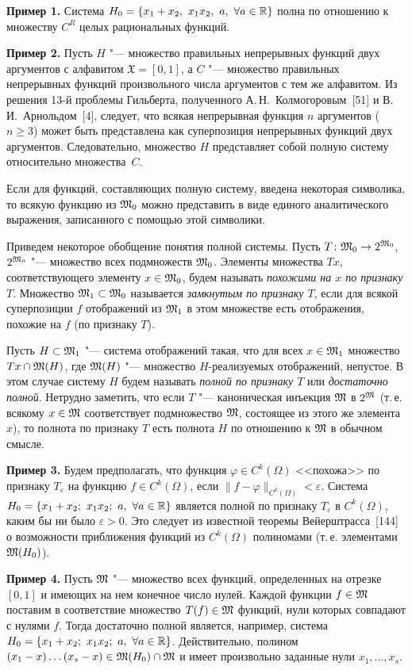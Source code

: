 {\small
\noindent\textbf{Пример 1.} Система
$H_0=\{x_1+x_2,\ x_1x_2,\ a,\ \forall a\in\mathbb R\}$ полна по отношению
к множеству $C^R$ целых рациональных функций.

\noindent\textbf{Пример 2.} Пусть $H$ "--- множество правильных
непрерывных функций двух аргументов с алфавитом $\mathfrak X=[0,1]$, а $C$
"--- множество правильных непрерывных функций произвольного числа
аргументов с тем же алфавитом. Из решения 13-й проблемы Гильберта,
полученного А.\,Н.~Колмогоровым~[51] и В.\,И.~Арнольдом~[4], следует, что
всякая непрерывная функция $n$ аргументов ($n\ge3$) может быть представлена
как суперпозиция непрерывных функций двух аргументов. Следовательно,
множество $H$ представляет собой полную систему относительно
множества~$C$.\par}
%

Если для функций, составляющих полную систему, введена некоторая
символика, то всякую функцию из $\mathfrak M_0$ можно представить в виде единого
аналитического выражения, записанного с помощью этой символики.

Приведем некоторое обобщение понятия полной системы. Пусть
$T\colon\mathfrak M_0\to2^{\mathfrak M_0}$, $2^{\mathfrak M_0}$ "--- множество всех подмножеств
$\mathfrak M_0$. Элементы множества $Tx$, соответствующего элементу $x\in\mathfrak M_0$,
будем называть \emph{похожими на $x$ по признаку $T$}. Множество
$\mathfrak M_1\subset\mathfrak M_0$ называется \emph{замкнутым по признаку $T$}, если для
всякой суперпозиции $f$ отображений из $\mathfrak M_1$ в этом множестве есть
отображения, похожие на $f$ (по признаку $T$).

Пусть $H\subset\mathfrak M_1$ "--- система отображений такая, что для всех
$x\in\mathfrak M_1$ множество $Tx\cap\mathfrak M(H)$, где $\mathfrak M(H)$ "--- множество
$H$-реализуемых отображений, непустое. В этом случае систему $H$ будем
называть \emph{полной по признаку $T$} или \emph{достаточно полной}.
Нетрудно заметить, что если $T$ "--- каноническая инъекция $\mathfrak M$ в $2^{\mathfrak M}$
(т.\,е. всякому $x\in\mathfrak M$ соответствует подмножество $\mathfrak M$, состоящее из
этого же элемента $x$), то полнота по признаку $T$ есть полнота $H$ по
отношению к $\mathfrak M$ в обычном смысле.

{\small
\noindent\textbf{Пример 3.} Будем предполагать, что функция
$\varphi\in C^k(\Omega)$ <<похожа>> по признаку $T_\varepsilon$ на функцию
$f\in C^k(\Omega)$, если $\|f-\varphi\|_{C^k(\Omega)}<\varepsilon$. Система
$H_0=\{x_1+x_2;\ x_1x_2;\ a,\ \forall a\in\mathbb R\}$ является полной по
признаку $T_\varepsilon$ в $C^k(\Omega)$, каким бы ни было
$\varepsilon>0$. Это следует из известной теоремы Вейерштрасса~[144]
о возможности приближения функций из $C^k(\Omega)$ полиномами (т.\,е.
элементами $\mathfrak M(H_0)$).

\noindent\textbf{Пример 4.} Пусть $\mathfrak M$ "--- множество всех функций,
определенных на отрезке $[0,1]$ и имеющих на нем конечное число нулей.
Каждой функции $f\in\mathfrak M$ поставим в соответствие множество $T(f)\in\mathfrak M$
функций, нули которых совпадают с нулями $f$. Тогда достаточно полной
является, например, система $H_0=\{x_1+x_2;\ x_1x_2;\ a,\ \forall a\in\mathbb R\}$.
Действительно, полином $(x_1-x)\dots(x_s-x)\in\mathfrak M(H_0)\cap\mathfrak M$ и имеет
произвольно заданные нули $x_1,\dots,x_s$.\par}

